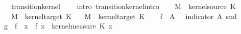 \begin{isabellebody}
{\ \ {\isacharparenleft}{\kern0pt}\ {\isachardoublequoteopen}transition{\isacharunderscore}{\kern0pt}kernel\ {\isacharquery}{\kern0pt}{\isasymOmega}\ {\isacharquery}{\kern0pt}{\isasymOmega}\ {\isacharquery}{\kern0pt}{\isasymkappa}{\isachardoublequoteclose}{\isacharparenright}{\kern0pt}%
}%
%
\isadelimproof
%
\endisadelimproof
%
\isatagproof
{}\isamarkupfalse%
\ {\isacharparenleft}{\kern0pt}intro\ transition{\isacharunderscore}{\kern0pt}kernel{\isachardot}{\kern0pt}intro{\isacharparenright}{\kern0pt}\isanewline
\ \ \isamarkupfalse%
\ {\isacharquery}{\kern0pt}M{}\ {\isacharequal}{\kern0pt}\ {\isachardoublequoteopen}kernel{\isacharunderscore}{\kern0pt}source\ K{\isacharunderscore}{\kern0pt}{}{\isachardoublequoteclose}\isanewline
\ \ \ {\isacharquery}{\kern0pt}M{}\ {\isacharequal}{\kern0pt}\ {\isachardoublequoteopen}kernel{\isacharunderscore}{\kern0pt}target\ K{\isacharunderscore}{\kern0pt}{}{\isachardoublequoteclose}\isanewline
\ \ \ {\isacharquery}{\kern0pt}M{}\ {\isacharequal}{\kern0pt}\ {\isachardoublequoteopen}kernel{\isacharunderscore}{\kern0pt}target\ K{\isacharunderscore}{\kern0pt}{}{\isachardoublequoteclose}\isanewline
\isanewline
\ \ \isamarkupfalse%
\ {\isacharquery}{\kern0pt}f\ {\isacharequal}{\kern0pt}\ {\isachardoublequoteopen}{\isacharparenleft}{\kern0pt}{\isasymlambda}A{\isacharprime}{\kern0pt}{\isachardot}{\kern0pt}\ {\isasymlambda}{\isacharparenleft}{\kern0pt}{\isasymomega}\ {\isasymomega}\ indicator\ A{\isacharprime}{\kern0pt}\ {\isacharparenleft}{\kern0pt}snd\ {\isasymomega}\ {\isasymomega}\isanewline
\ \ \isamarkupfalse%
\ {\isacharquery}{\kern0pt}g\ {\isacharequal}{\kern0pt}\ {\isachardoublequoteopen}{\isasymlambda}f{\isachardot}{\kern0pt}\ {\isacharparenleft}{\kern0pt}{\isasymlambda}\ x{\isachardot}{\kern0pt}\ {\isasymintegral}\isactrlsup {\isacharplus}{\kern0pt}{\isasymomega}\ f\ {\isacharparenleft}{\kern0pt}x{\isacharcomma}{\kern0pt}\ {\isasymomega}\ {\isasympartial}kernel{\isacharunderscore}{\kern0pt}measure\ K{\isacharunderscore}{\kern0pt}{}\ x{\isacharparenright}{\kern0pt}{\isachardoublequoteclose}\isanewline

\end{isabellebody}
